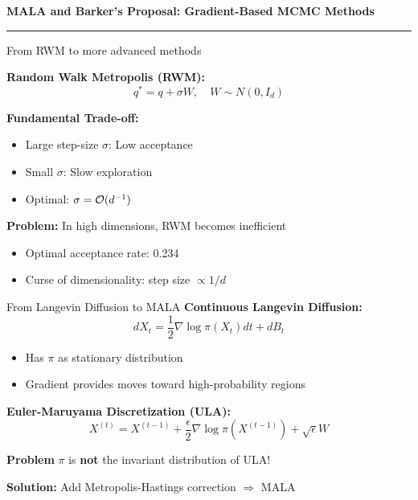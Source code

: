 \begin{frame}
	\vspace{2cm}
	\begin{center}
		{\Huge\textbf{\textcolor{copenhagenred}{MALA and Barker's Proposal: Gradient-Based MCMC Methods}}}
		\vspace{1cm}

		\rule{4cm}{3pt}
		\vspace{2cm}
	\end{center}
\end{frame}

\begin{frame}{From RWM to more advanced methods}

	\textbf{Random Walk Metropolis (RWM):}
	$$q^* = q + \sigma W, \quad W \sim N(0, I_d)$$

	\textbf{Fundamental Trade-off:}
	\begin{itemize}
		\item Large step-size $\sigma$: Low acceptance
		\item Small $\sigma$: Slow exploration
		\item Optimal: $\sigma = \mathcal{O}(d^{-1})$
	\end{itemize}

	\vspace{1em}
	\textbf{Problem:} In high dimensions, RWM becomes inefficient
	\begin{itemize}
		\item Optimal acceptance rate: 0.234
		\item Curse of dimensionality: step size $\propto 1/d$
	\end{itemize}
\end{frame}

\begin{frame}{From Langevin Diffusion to MALA}
	\textbf{Continuous Langevin Diffusion:}
	$$dX_t = \frac{1}{2}\nabla\log\pi(X_t)dt + dB_t$$

	\begin{itemize}
		\item Has $\pi$ as stationary distribution
		\item Gradient provides moves toward high-probability regions
	\end{itemize}

	\vspace{0.5em}

	\textbf{Euler-Maruyama Discretization (ULA):}
	$$X^{(t)} = X^{(t-1)} + \frac{\epsilon}{2}\nabla\log\pi(X^{(t-1)}) + \sqrt{\epsilon}W$$

	\textbf{Problem} $\pi$ is \textbf{not} the invariant distribution of ULA!

	\textbf{Solution:} Add Metropolis-Hastings correction $\Rightarrow$ MALA
\end{frame}


